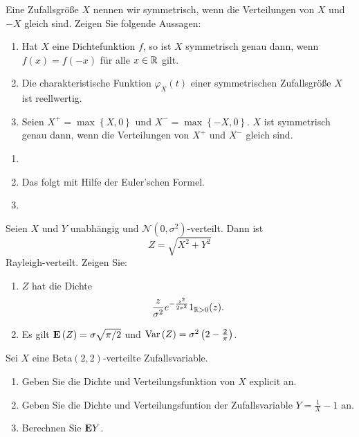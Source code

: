  Eine Zufallsgröße $X$ nennen wir
symmetrisch, wenn die Verteilungen von $X$ und $-X$ gleich sind. 
Zeigen Sie folgende Aussagen:
\begin{enumerate}
    \item Hat $X$ eine Dichtefunktion $f$, so ist $X$ symmetrisch genau
        dann, wenn $f(x)= f(-x)$ für alle $x\in\mathbb R$ gilt. 
    \item Die charakteristische Funktion $\varphi_{X}(t)$ einer symmetrischen
        Zufallsgröße $X$ ist reellwertig. 
    \item Seien $X^{+} = \max\left\{ X,0 \right\}$ und $X^{-} = \max\left\{ -X,0 \right\}$.
        $X$ ist symmetrisch genau dann, wenn die Verteilungen von $X^{+}$ und $X^{-}$ 
        gleich sind.
\end{enumerate}

\solution
\begin{enumerate}
    \item 

    \item Das folgt mit Hilfe der Euler'schen Formel.

    \item 
\end{enumerate}


  Seien $X$ und $Y$ unabhängig und 
$\mathcal N (0, \sigma^2)$-verteilt. Dann ist
\begin{equation*}
    Z= \sqrt{X^2 + Y^2} 
\end{equation*}
Rayleigh-verteilt. Zeigen Sie:
\begin{enumerate}
    \item $Z$ hat die Dichte
        \begin{equation*}
            \frac{z}{\sigma^2}e^{-\frac{z^2}{2\sigma^2}}1_{\mathbb R>0}(z).
        \end{equation*}
    \item Es gilt $\mathbf{E}\left( Z \right) = \sigma \sqrt{\pi/2}$ und $\operatorname{Var}\left( Z
        \right) = \sigma^2 \left( 2 - \frac{2}{\pi} \right)$.
\end{enumerate}



 Sei $X$ eine Beta$(2,2)$-verteilte Zufallsvariable.
\begin{enumerate}
    \item Geben Sie die Dichte und Verteilungsfunktion von $X$ explicit an. 
    \item Geben Sie die Dichte und Verteilungsfuntion der Zufallsvariable
        $Y = \frac{1}{X} - 1$ an. 
    \item Berechnen Sie $\mathbf{E} Y$.  
\end{enumerate}


